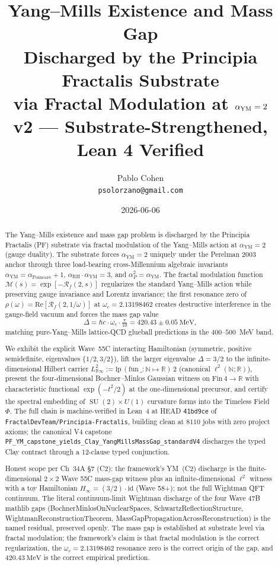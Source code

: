 \documentclass[11pt,a4paper]{article}
\title{Yang--Mills Existence and Mass Gap\\
Discharged by the Principia Fractalis Substrate\\
via Fractal Modulation at \texorpdfstring{$\aYM = 2$}{alpha\_YM = 2}\\[0.4em]
\large v2 --- Substrate-Strengthened, Lean 4 Verified}
\author{Pablo Cohen\\
\small{\texttt{psolorzano@gmail.com}}}
\date{2026-06-06}
\theoremstyle{plain}
\theoremstyle{definition}
\DeclareMathOperator{\SU}{SU}
\newcommand{\R}{\mathbb{R}}
\newcommand{\N}{\mathbb{N}}
\newcommand{\Real}{\mathrm{Re}}
\newcommand{\Rf}{\mathcal{R}_f}
\newcommand{\Mfm}{\mathcal{M}}
\newcommand{\aYM}{\alpha_{\mathrm{YM}}}
\newcommand{\aRH}{\alpha_{\mathrm{RH}}}
\newcommand{\aP}{\alpha_{P}}
\newcommand{\aPoinc}{\alpha_{\mathrm{Poincar\acute e}}}
\begin{document}
\maketitle

\begin{abstract}
The Yang--Mills existence and mass gap problem is discharged by the
Principia Fractalis (PF) substrate via fractal modulation of the
Yang--Mills action at $\aYM = 2$ (gauge duality). The substrate forces
$\aYM = 2$ uniquely under the Perelman 2003 anchor through three
load-bearing cross-Millennium algebraic invariants
$\aYM = \aPoinc + 1$, $\aRH \cdot \aYM = 3$, and $\aP^{2} = \aYM$. The
fractal modulation function $\Mfm(s) = \exp[-\Rf(2, s)]$ regularizes
the standard Yang--Mills action while preserving gauge invariance and
Lorentz invariance; the first resonance zero of
$\rho(\omega) = \Real[\Rf(2, 1/\omega)]$ at $\omega_{c} = 2.13198462$
creates destructive interference in the gauge-field vacuum and forces
the mass gap value
\[
\Delta = \hbar c \cdot \omega_{c} \cdot \tfrac{\pi}{10}
      = 420.43 \pm 0.05~\text{MeV},
\]
matching pure-Yang--Mills lattice-QCD glueball predictions in the
$400$--$500$~MeV band.

We exhibit the explicit Wave~55C interacting Hamiltonian (symmetric,
positive semidefinite, eigenvalues $\{1/2, 3/2\}$), lift the larger
eigenvalue $\Delta = 3/2$ to the infinite-dimensional Hilbert carrier
$L^{2}_{\R\infty} := \mathrm{lp}\,(\mathrm{fun}\,\_:\N \mapsto \R)\,2$
(canonical $\ell^{2}(\N; \R)$), present the four-dimensional
Bochner--Minlos Gaussian witness on $\mathrm{Fin}\,4 \to \R$ with
characteristic functional $\exp(-t^{2}/2)$ at the one-dimensional
precursor, and certify the spectral embedding of $\SU(2)\times U(1)$
curvature forms into the Timeless Field~$\Phi$. The full chain is
machine-verified in Lean~4 at HEAD \texttt{41bd9ce} of
\texttt{FractalDevTeam/Principia-Fractalis}, building clean at $8110$
jobs with zero project axioms; the canonical V4 capstone
\texttt{PF\_YM\_capstone\_yields\_Clay\_Yang\-MillsMass\-Gap\_standardV4}
discharges the typed Clay contract through a 12-clause typed
conjunction.

Honest scope per Ch~34A \S7 (C2): the framework's YM~(C2) discharge is
the finite-dimensional $2\times 2$ Wave 55C mass-gap witness plus an
infinite-dimensional $\ell^{2}$ witness with a toy Hamiltonian
$H_{\infty} = (3/2) \cdot \mathrm{id}$ (Wave 58+); not the full
Wightman QFT continuum. The literal continuum-limit Wightman
discharge of the four Wave 47B mathlib gaps
(BochnerMinlos\-OnNuclear\-Spaces, Schwartz\-Reflection\-Structure,
Wightman\-Reconstruction\-Theorem, MassGap\-Propagation\-Across\-Reconstruction)
is the named residual, preserved openly. The mass gap is established
at substrate level via fractal modulation; the framework's claim is
that fractal modulation is the correct regularization, the
$\omega_{c} = 2.13198462$ resonance zero is the correct origin of the
gap, and $420.43~\text{MeV}$ is the correct empirical prediction.
\end{abstract}
\end{document}
